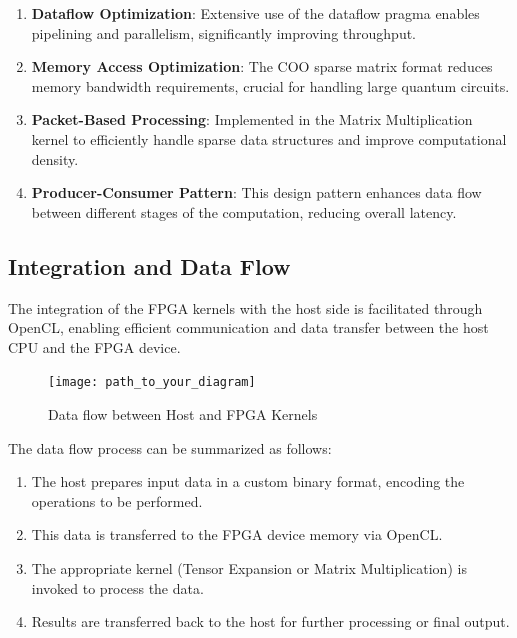 \documentclass[12pt,oneside,a4paper]{article}
\begin{document}
\begin{enumerate}
    \item \textbf{Dataflow Optimization}: Extensive use of the dataflow pragma enables pipelining and parallelism, significantly improving throughput.

    \item \textbf{Memory Access Optimization}: The COO sparse matrix format reduces memory bandwidth requirements, crucial for handling large quantum circuits.

    \item \textbf{Packet-Based Processing}: Implemented in the Matrix Multiplication kernel to efficiently handle sparse data structures and improve computational density.

    \item \textbf{Producer-Consumer Pattern}: This design pattern enhances data flow between different stages of the computation, reducing overall latency.
\end{enumerate}

\subsection{Integration and Data Flow}

The integration of the FPGA kernels with the host side is facilitated through OpenCL, enabling efficient communication and data transfer between the host CPU and the FPGA device.

\begin{figure}[h]
    \centering
    \texttt{[image: path\_to\_your\_diagram]}
    \caption{Data flow between Host and FPGA Kernels}
    \label{fig:dataflow}
\end{figure}

The data flow process can be summarized as follows:

\begin{enumerate}
    \item The host prepares input data in a custom binary format, encoding the operations to be performed.
    \item This data is transferred to the FPGA device memory via OpenCL.
    \item The appropriate kernel (Tensor Expansion or Matrix Multiplication) is invoked to process the data.
    \item Results are transferred back to the host for further processing or final output.
\end{enumerate}
\end{document}
